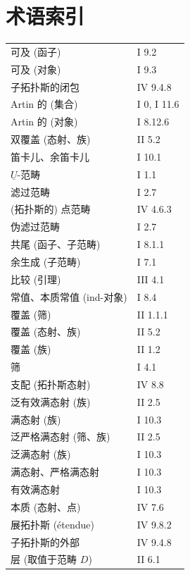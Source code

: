 \chapter*{术语索引}
\begingroup
\small
\setlength{\LTleft}{0pt}
\setlength{\LTright}{0pt}
\begin{longtable}{@{}p{.68\linewidth}p{.27\linewidth}@{}}
可及 (函子) & I 9.2\\
可及 (对象) & I 9.3\\
子拓扑斯的闭包 & IV 9.4.8\\
Artin 的 (集合) & I 0, I 11.6\\
Artin 的 (对象) & I 8.12.6\\[.7em]
双覆盖 (态射、族) & II 5.2\\
笛卡儿、余笛卡儿 & I 10.1\\
$\underline U$-范畴 & I 1.1\\
滤过范畴 & I 2.7\\
(拓扑斯的) 点范畴 & IV 4.6.3\\
伪滤过范畴 & I 2.7\\
共尾 (函子、子范畴) & I 8.1.1\\
余生成 (子范畴) & I 7.1\\
比较 (引理) & III 4.1\\
常值、本质常值 (ind-对象) & I 8.4\\
覆盖 (筛) & II 1.1.1\\
覆盖 (态射、族) & II 5.2\\
覆盖 (族) & II 1.2\\
筛 & I 4.1\\[.7em]
支配 (拓扑斯态射) & IV 8.8\\
泛有效满态射 (族) & II 2.5\\
满态射 (族) & I 10.3\\
泛严格满态射 (筛、族) & II 2.5\\
泛满态射 (族) & I 10.3\\
满态射、严格满态射 & I 10.3\\
有效满态射 & I 10.3\\
本质 (态射、点) & IV 7.6\\
展拓扑斯 (étendue) & IV 9.8.2\\
子拓扑斯的外部 & IV 9.4.8\\[.7em]
层 (取值于范畴 $D$) & II 6.1\\

\end{longtable}
